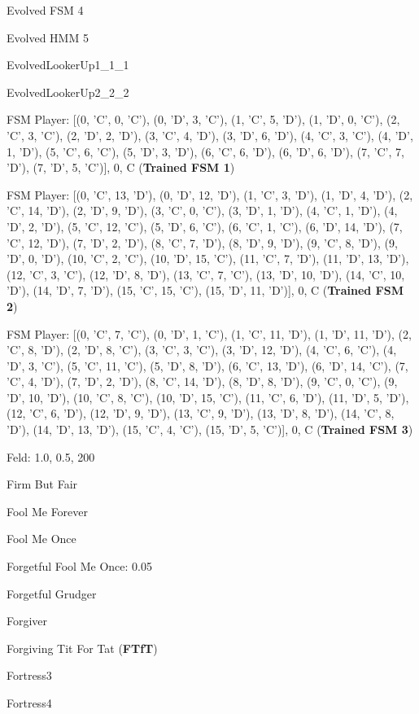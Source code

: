 \item Evolved FSM 4
\item Evolved HMM 5
\item EvolvedLookerUp1\_1\_1
\item EvolvedLookerUp2\_2\_2
\item FSM Player: [(0, 'C', 0, 'C'), (0, 'D', 3, 'C'), (1, 'C', 5, 'D'), (1, 'D', 0, 'C'), (2, 'C', 3, 'C'), (2, 'D', 2, 'D'), (3, 'C', 4, 'D'), (3, 'D', 6, 'D'), (4, 'C', 3, 'C'), (4, 'D', 1, 'D'), (5, 'C', 6, 'C'), (5, 'D', 3, 'D'), (6, 'C', 6, 'D'), (6, 'D', 6, 'D'), (7, 'C', 7, 'D'), (7, 'D', 5, 'C')], 0, C
(\textbf{Trained FSM 1})\item FSM Player: [(0, 'C', 13, 'D'), (0, 'D', 12, 'D'), (1, 'C', 3, 'D'), (1, 'D', 4, 'D'), (2, 'C', 14, 'D'), (2, 'D', 9, 'D'), (3, 'C', 0, 'C'), (3, 'D', 1, 'D'), (4, 'C', 1, 'D'), (4, 'D', 2, 'D'), (5, 'C', 12, 'C'), (5, 'D', 6, 'C'), (6, 'C', 1, 'C'), (6, 'D', 14, 'D'), (7, 'C', 12, 'D'), (7, 'D', 2, 'D'), (8, 'C', 7, 'D'), (8, 'D', 9, 'D'), (9, 'C', 8, 'D'), (9, 'D', 0, 'D'), (10, 'C', 2, 'C'), (10, 'D', 15, 'C'), (11, 'C', 7, 'D'), (11, 'D', 13, 'D'), (12, 'C', 3, 'C'), (12, 'D', 8, 'D'), (13, 'C', 7, 'C'), (13, 'D', 10, 'D'), (14, 'C', 10, 'D'), (14, 'D', 7, 'D'), (15, 'C', 15, 'C'), (15, 'D', 11, 'D')], 0, C
(\textbf{Trained FSM 2})\item FSM Player: [(0, 'C', 7, 'C'), (0, 'D', 1, 'C'), (1, 'C', 11, 'D'), (1, 'D', 11, 'D'), (2, 'C', 8, 'D'), (2, 'D', 8, 'C'), (3, 'C', 3, 'C'), (3, 'D', 12, 'D'), (4, 'C', 6, 'C'), (4, 'D', 3, 'C'), (5, 'C', 11, 'C'), (5, 'D', 8, 'D'), (6, 'C', 13, 'D'), (6, 'D', 14, 'C'), (7, 'C', 4, 'D'), (7, 'D', 2, 'D'), (8, 'C', 14, 'D'), (8, 'D', 8, 'D'), (9, 'C', 0, 'C'), (9, 'D', 10, 'D'), (10, 'C', 8, 'C'), (10, 'D', 15, 'C'), (11, 'C', 6, 'D'), (11, 'D', 5, 'D'), (12, 'C', 6, 'D'), (12, 'D', 9, 'D'), (13, 'C', 9, 'D'), (13, 'D', 8, 'D'), (14, 'C', 8, 'D'), (14, 'D', 13, 'D'), (15, 'C', 4, 'C'), (15, 'D', 5, 'C')], 0, C
(\textbf{Trained FSM 3})\item Feld: 1.0, 0.5, 200
\item Firm But Fair
\item Fool Me Forever
\item Fool Me Once
\item Forgetful Fool Me Once: 0.05
\item Forgetful Grudger
\item Forgiver
\item Forgiving Tit For Tat
(\textbf{FTfT})\item Fortress3
\item Fortress4
